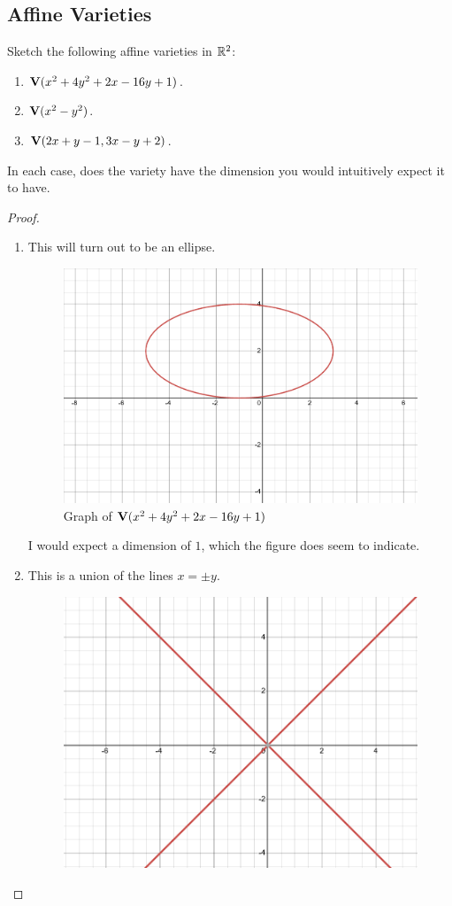 \subsection{Affine Varieties}


\begin{exercise}{1}
Sketch the following affine varieties in $\mathbb{R}^2$:
\begin{enumerate}
    \item $\mathbf{V}(x^2 + 4y^2 + 2x - 16y + 1)$.
    \item $\mathbf{V}(x^2 - y^2)$.
    \item $\mathbf{V}(2x+y-1, 3x - y + 2)$.
\end{enumerate}
In each case, does the variety have the dimension you would intuitively expect it to have.
\end{exercise}
\begin{proof}
    \begin{enumerate}
        \item This will turn out to be an ellipse.
        \begin{figure}[H]
            \centering
            \includegraphics[width=0.5\linewidth]{cox-little-oshea/assets/sec1-2-ex1a.png}
     \caption{Graph of $\mathbf{V}(x^2 + 4y^2 + 2x - 16y + 1)$}
     \label{fig:sec1-2-ex1a}
        \end{figure}
        I would expect a dimension of $1$, which the figure does seem to indicate.
        \item This is a union of the lines $x=\pm y$.
        \begin{figure}[H]
            \centering
            \includegraphics[width=0.5\linewidth]{cox-little-oshea/assets/sec1-2-ex1b.png}

\end{figure}
\end{enumerate}
\end{proof}
